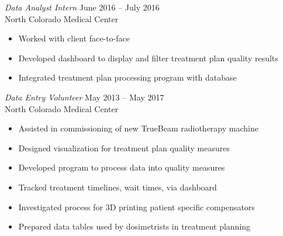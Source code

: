 \documentclass[10pt]{article}
\begin{document}
\begin{description}[leftmargin=!,labelwidth=3cm,align=left,itemsep=-9px,partopsep=-5px]
    \textit{Data Analyst Intern} \hfill June 2016 -- July 2016\\
    North Colorado Medical Center
    \begin{itemize}[rightmargin=2cm,noitemsep]%
        \item Worked with client face-to-face
        \item Developed dashboard to display and filter treatment plan quality results
        \item Integrated treatment plan processing program with database
    \end{itemize}

    \textit{Data Entry Volunteer} \hfill May 2013 -- May 2017\\
    North Colorado Medical Center
    \begin{itemize}[rightmargin=2cm,noitemsep]%
        \item Assisted in commissioning of new TrueBeam radiotherapy machine
        \item Designed visualization for treatment plan quality measures
        \item Developed program to process data into quality measures
        \item Tracked treatment timelines, wait times, via dashboard
        \item Investigated process for 3D printing patient specific compensators
        \item Prepared data tables used by dosimetrists in treatment planning
    \end{itemize}


\end{description}
\end{document}

